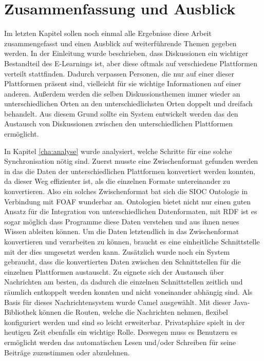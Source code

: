 
\chapter{Zusammenfassung und Ausblick} %
\label{cha:zusammenfassung_und_ausblick}

Im letzten Kapitel sollen noch einmal alle Ergebnisse diese Arbeit zusammengefasst und einen Ausblick auf weiterführende Themen gegeben werden. In der Einleitung wurde beschrieben, dass Diskussionen ein wichtiger Bestandteil des E-Learnings ist, aber diese oftmals auf verschiedene Plattformen verteilt stattfinden. Dadurch verpassen Personen, die nur auf einer dieser Plattformen präsent sind, vielleicht für sie wichtige Informationen auf einer anderen. Außerdem werden die selben Diskussionsthemen immer wieder an unterschiedlichen Orten an den unterschiedlichsten Orten doppelt und dreifach behandelt. Aus diesem Grund sollte ein System entwickelt werden das den Austausch von Diskussionen zwischen den unterschiedlichen Plattformen ermöglicht. 

In Kapitel \ref{cha:analyse} wurde analysiert, welche Schritte für eine solche Synchronisation nötig sind. Zuerst musste eine Zwischenformat gefunden werden in das die Daten der unterschiedlichen Plattformen konvertiert werden konnten, da dieser Weg effizienter ist, als die einzelnen Formate untereinander zu konvertieren. Also ein solches Zwischenformat bat sich die SIOC Ontologie in Verbindung mit FOAF wunderbar an. Ontologien bietet nicht nur einen guten Ansatz für die Integration von unterschiedlichen Datenformaten, mit RDF ist es sogar möglich dass Programme diese Daten verstehen und aus ihnen neues Wissen ableiten können. Um die Daten letztendlich in das Zwischenformat konvertieren und verarbeiten zu können, braucht es eine einheitliche Schnittstelle mit der dies umgesetzt werden kann. Zusätzlich wurde noch ein System gebraucht, dass die konvertierten Daten zwischen den Schnittstellen für die einzelnen Plattformen austauscht. Zu eignete sich der Austausch über Nachrichten am besten, da dadurch die einzelnen Schnittstellen zeitlich und räumlich entkoppelt werden konnten und nicht voneinander abhängig sind. Als Basis für dieses Nachrichtensystem wurde Camel ausgewählt. Mit dieser Java-Bibliothek können die Routen, welche die Nachrichten nehmen, flexibel konfiguriert werden und sind so leicht erweiterbar. Privatsphäre spielt in der heutigen Zeit ebenfalls ein wichtige Rolle. Deswegen muss es Benutzern es ermöglicht werden das automatischen Lesen und/oder Schreiben für seine Beiträge zuzustimmen oder abzulehnen.

